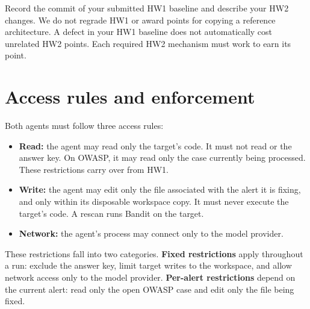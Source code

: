 \documentclass[9pt,letterpaper]{article}
\begin{document}
Record the commit of your submitted HW1 baseline and describe your HW2 changes.
We do not regrade HW1 or award points for copying a reference architecture. A
defect in your HW1 baseline does not automatically cost unrelated HW2 points.
Each required HW2 mechanism must work to earn its point.

\section{Access rules and enforcement}\label{sec:guardrails}

Both agents must follow three access rules:
\begin{itemize}
\item \textbf{Read:} the agent may read only the target's code. It must not read
   or the answer key. On OWASP, it may read only the case currently
  being processed. These restrictions carry over from HW1.
\item \textbf{Write:} the agent may edit only the file associated with the alert
  it is fixing, and only within its disposable workspace copy. It must never
  execute the target's code. A rescan runs Bandit on the target.
\item \textbf{Network:} the agent's process may connect only to the model provider.
\end{itemize}

These restrictions fall into two categories. \textbf{Fixed restrictions} apply
throughout a run: exclude the answer key, limit target writes to the workspace,
and allow network access only to the model provider. \textbf{Per-alert
restrictions} depend on the current alert: read only the open OWASP case and edit
only the file being fixed.
\end{document}
